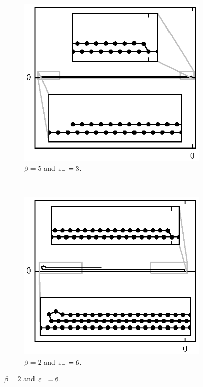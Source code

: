 	\begin{figure}[h!]
		\centering
		\begin{subfigure}{.5\textwidth}
			\centering
			\includegraphics{./fig/ch3/fs/b5_eb3.eps}
			\caption{$\beta=5$ and $\varepsilon_-=3$.\label{subfig:lazy}}
		\end{subfigure}%
		~
		\begin{subfigure}{.5\textwidth}
			\centering
			\includegraphics{./fig/ch3/fs/b2_eb6.eps}
			\caption{$\beta=2$ and $\varepsilon_-=6$.\label{subfig:lazy_loop}}
		\end{subfigure}


\end{figure}
